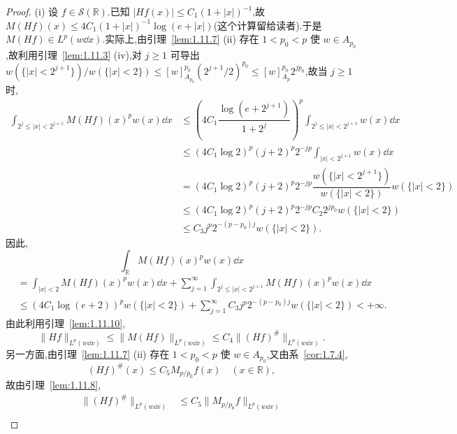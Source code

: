 \begin{proof}
(i) 设 $f \in \mathcal{S}(\mathbb{R})$.已知 $|Hf(x)| \leq C_{1}(1 + |x|)^{-1}$,故 $M(Hf)(x) \leq 4C_{1}(1 + |x|)^{-1}\log(e + |x|)$(这个计算留给读者).于是 $M(Hf) \in L^{p}(w\dd x)$.实际上,由引理~\ref{lem:1.11.7} (ii) 存在 $1 < p_{0} < p$ 使 $w \in A_{p_{0}}$,故利用引理~\ref{lem:1.11.3} (iv),对 $j \geq 1$ 可导出 $w(\{|x| < 2^{j+1}\})/w(\{|x| < 2\}) \leq [w]_{A_{p_{0}}}^{p_{0}}(2^{j+1}/2)^{p_{0}} \leq [w]_{A_{p}}^{p_{0}}2^{jp_{0}}$,故当 $j \geq 1$ 时,
\begin{align*}
\displaystyle\int_{2^{j} \leq |x| < 2^{j+1}}M(Hf)(x)^{p}w(x)\dd x&\leq \left(4C_{1}\dfrac{\log(e + 2^{j+1})}{1 + 2^{j}}\right)^{p}\displaystyle\int_{2^{j} \leq |x| < 2^{j+1}}w(x)\dd x  \\
&\leq (4C_{1}\log 2)^{p}(j + 2)^{p}2^{-jp}\displaystyle\int_{|x| < 2^{j+1}}w(x)\dd x \\
&= (4C_{1}\log 2)^{p}(j + 2)^{p}2^{-jp}\dfrac{w(\{|x| < 2^{j+1}\})}{w(\{|x| < 2\})}w(\{|x| < 2\}) \\
&\leq (4C_{1}\log 2)^{p}(j + 2)^{p}2^{-jp}C_{2}2^{jp_{0}}w(\{|x| < 2\}) \\
&\leq C_{3}j^{p}2^{-(p-p_{0})j}w(\{|x| < 2\}).
\end{align*}
因此,
\begin{equation*}
\int_{\mathbb{R}}M(Hf)(x)^{p}w(x)\dd x
\end{equation*}
\begin{align*}
&= \displaystyle\int_{|x| < 2}M(Hf)(x)^{p}w(x)\dd x + \sum_{j=1}^{\infty}\int_{2^{j} \leq |x| < 2^{j+1}}M(Hf)(x)^{p}w(x)\dd x \\
&\leq \left(4C_{1}\log(e + 2)\right)^{p}w(\{|x| < 2\}) + \displaystyle\sum_{j=1}^{\infty}C_{3}j^{p}2^{-(p-p_{0})j}w(\{|x| < 2\}) < +\infty.
\end{align*}
由此利用引理~\ref{lem:1.11.10},
\begin{equation}\tag{1.11.15}
\| Hf \|_{L^{p}(w\dd x)} \leq \| M(Hf) \|_{L^{p}(w\dd x)} \leq C_{4}\| (Hf)^{\#} \|_{L^{p}(w\dd x)}.
\label{eq:1.11.15}\end{equation}
另一方面,由引理~\ref{lem:1.11.7} (ii) 存在 $1 < p_{0} < p$ 使 $w \in A_{p_{0}}$,又由系~\ref{cor:1.7.4},
\begin{equation*}
(Hf)^{\#}(x) \leq C_{5}M_{p/p_{0}}f(x) \quad (x \in \mathbb{R}),
\end{equation*}
故由引理~\ref{lem:1.11.8},
\begin{equation}\tag{1.11.16}\begin{aligned}
\| (Hf)^{\#} \|_{L^{p}(w\dd x)} & \leq C_{5}\| M_{p/p_{0}}f \|_{L^{p}(w\dd x)} \\

\end{aligned}
\end{equation}
\end{proof}
